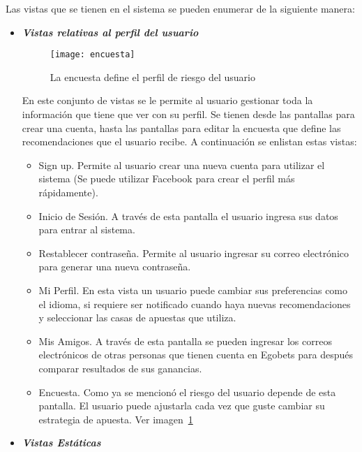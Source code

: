 		Las vistas que se tienen en el sistema se pueden enumerar de la siguiente manera:
		\begin{itemize}
			\item \emph{\textbf{Vistas relativas al perfil del usuario}}

			\begin{figure}[!htb]\centering
			   \begin {minipage}{0.7\textwidth}
			     \texttt{[image: encuesta]}
			     \caption{La encuesta define el perfil de riesgo del usuario}\label{Fig:encuesta}
			   \end{minipage}
			\end{figure}

			En este conjunto de vistas se le permite al usuario gestionar toda la información que tiene que ver con su perfil. Se tienen desde las pantallas para crear una cuenta, hasta las pantallas para editar la encuesta que define las recomendaciones que el usuario recibe.
			A continuación se enlistan estas vistas:
			\begin{itemize}
				\item Sign up. Permite al usuario crear una nueva cuenta para utilizar el sistema (Se puede utilizar Facebook \cite{facebookDocuWeb} para crear el perfil más rápidamente).
				\item Inicio de Sesión. A través de esta pantalla el usuario ingresa sus datos para entrar al sistema.
				\item Restablecer contraseña. Permite al usuario ingresar su correo electrónico para generar una nueva contraseña.
				\item Mi Perfil. En esta vista un usuario puede cambiar sus preferencias como el idioma, si requiere ser notificado cuando haya nuevas recomendaciones y seleccionar las casas de apuestas que utiliza.
				\item Mis Amigos. A través de esta pantalla se pueden ingresar los correos electrónicos de otras personas que tienen cuenta en Egobets para después comparar resultados de sus ganancias.
				\item Encuesta. Como ya se mencionó el riesgo del usuario depende de esta pantalla. El usuario puede ajustarla cada vez que guste cambiar su estrategia de apuesta. Ver imagen~\ref{Fig:encuesta}


			\end{itemize}


			\item \emph{\textbf{Vistas Estáticas}}




\end{itemize}
